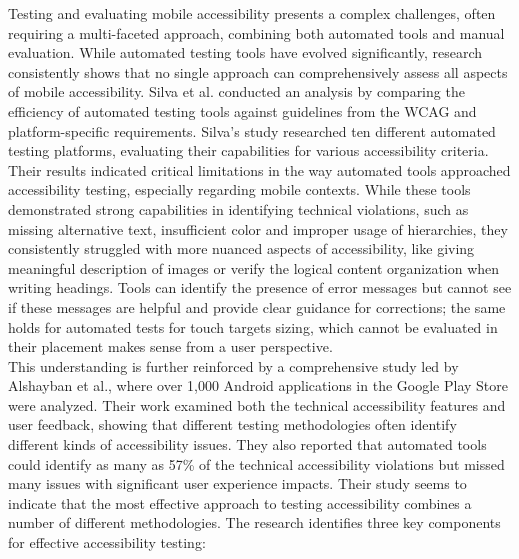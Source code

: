 Testing and evaluating mobile accessibility presents a complex challenges, often requiring a multi-faceted approach, combining both automated tools and manual evaluation. While automated testing tools have evolved significantly, research consistently shows that no single approach can comprehensively assess all aspects of mobile accessibility.
Silva et al. \cite{silva2018survey} conducted an analysis by comparing the efficiency of automated testing tools against guidelines from the WCAG and platform-specific requirements. Silva's study researched ten different automated testing platforms, evaluating their capabilities for various accessibility criteria. Their results indicated critical limitations in the way automated tools approached accessibility testing, especially regarding mobile contexts. 
While these tools demonstrated strong capabilities in identifying technical violations, such as missing alternative text, insufficient color and improper usage of hierarchies, they consistently struggled with more nuanced aspects of accessibility, like giving meaningful description of images or verify the logical content organization when writing headings. Tools can identify the presence of error messages but cannot see if these messages are helpful and provide clear guidance for corrections; the same holds for automated tests for touch targets sizing, which cannot be evaluated in their placement makes sense from a user perspective. \\

This understanding is further reinforced by a comprehensive study led by Alshayban et al., \cite{alshayban2020accessibility} where over 1,000 Android applications in the Google Play Store were analyzed. Their work examined both the technical accessibility features and user feedback, showing that different testing methodologies often identify different kinds of accessibility issues. They also reported that automated tools could identify as many as 57\% of the technical accessibility violations but missed many issues with significant user experience impacts. Their study seems to indicate that the most effective approach to testing accessibility combines a number of different methodologies. The research identifies three key components for effective accessibility testing:

